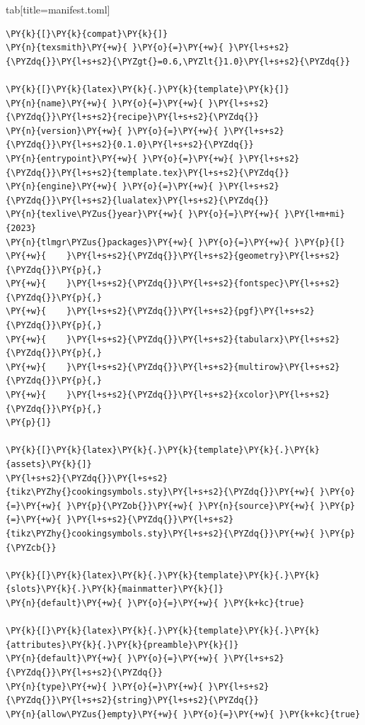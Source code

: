 \documentclass[a4paper,twoside]{article}
\begin{document}
\begin{tsdiv}{tab}[title=manifest.toml]
\begin{tscode}[lang=toml, engine=pygments]
\begin{Verbatim}[commandchars=\\\{\},breaklines, breakanywhere, commandchars=\\\{\}]
\PY{k}{[}\PY{k}{compat}\PY{k}{]}
\PY{n}{texsmith}\PY{+w}{ }\PY{o}{=}\PY{+w}{ }\PY{l+s+s2}{\PYZdq{}}\PY{l+s+s2}{\PYZgt{}=0.6,\PYZlt{}1.0}\PY{l+s+s2}{\PYZdq{}}

\PY{k}{[}\PY{k}{latex}\PY{k}{.}\PY{k}{template}\PY{k}{]}
\PY{n}{name}\PY{+w}{ }\PY{o}{=}\PY{+w}{ }\PY{l+s+s2}{\PYZdq{}}\PY{l+s+s2}{recipe}\PY{l+s+s2}{\PYZdq{}}
\PY{n}{version}\PY{+w}{ }\PY{o}{=}\PY{+w}{ }\PY{l+s+s2}{\PYZdq{}}\PY{l+s+s2}{0.1.0}\PY{l+s+s2}{\PYZdq{}}
\PY{n}{entrypoint}\PY{+w}{ }\PY{o}{=}\PY{+w}{ }\PY{l+s+s2}{\PYZdq{}}\PY{l+s+s2}{template.tex}\PY{l+s+s2}{\PYZdq{}}
\PY{n}{engine}\PY{+w}{ }\PY{o}{=}\PY{+w}{ }\PY{l+s+s2}{\PYZdq{}}\PY{l+s+s2}{lualatex}\PY{l+s+s2}{\PYZdq{}}
\PY{n}{texlive\PYZus{}year}\PY{+w}{ }\PY{o}{=}\PY{+w}{ }\PY{l+m+mi}{2023}
\PY{n}{tlmgr\PYZus{}packages}\PY{+w}{ }\PY{o}{=}\PY{+w}{ }\PY{p}{[}
\PY{+w}{    }\PY{l+s+s2}{\PYZdq{}}\PY{l+s+s2}{geometry}\PY{l+s+s2}{\PYZdq{}}\PY{p}{,}
\PY{+w}{    }\PY{l+s+s2}{\PYZdq{}}\PY{l+s+s2}{fontspec}\PY{l+s+s2}{\PYZdq{}}\PY{p}{,}
\PY{+w}{    }\PY{l+s+s2}{\PYZdq{}}\PY{l+s+s2}{pgf}\PY{l+s+s2}{\PYZdq{}}\PY{p}{,}
\PY{+w}{    }\PY{l+s+s2}{\PYZdq{}}\PY{l+s+s2}{tabularx}\PY{l+s+s2}{\PYZdq{}}\PY{p}{,}
\PY{+w}{    }\PY{l+s+s2}{\PYZdq{}}\PY{l+s+s2}{multirow}\PY{l+s+s2}{\PYZdq{}}\PY{p}{,}
\PY{+w}{    }\PY{l+s+s2}{\PYZdq{}}\PY{l+s+s2}{xcolor}\PY{l+s+s2}{\PYZdq{}}\PY{p}{,}
\PY{p}{]}

\PY{k}{[}\PY{k}{latex}\PY{k}{.}\PY{k}{template}\PY{k}{.}\PY{k}{assets}\PY{k}{]}
\PY{l+s+s2}{\PYZdq{}}\PY{l+s+s2}{tikz\PYZhy{}cookingsymbols.sty}\PY{l+s+s2}{\PYZdq{}}\PY{+w}{ }\PY{o}{=}\PY{+w}{ }\PY{p}{\PYZob{}}\PY{+w}{ }\PY{n}{source}\PY{+w}{ }\PY{p}{=}\PY{+w}{ }\PY{l+s+s2}{\PYZdq{}}\PY{l+s+s2}{tikz\PYZhy{}cookingsymbols.sty}\PY{l+s+s2}{\PYZdq{}}\PY{+w}{ }\PY{p}{\PYZcb{}}

\PY{k}{[}\PY{k}{latex}\PY{k}{.}\PY{k}{template}\PY{k}{.}\PY{k}{slots}\PY{k}{.}\PY{k}{mainmatter}\PY{k}{]}
\PY{n}{default}\PY{+w}{ }\PY{o}{=}\PY{+w}{ }\PY{k+kc}{true}

\PY{k}{[}\PY{k}{latex}\PY{k}{.}\PY{k}{template}\PY{k}{.}\PY{k}{attributes}\PY{k}{.}\PY{k}{preamble}\PY{k}{]}
\PY{n}{default}\PY{+w}{ }\PY{o}{=}\PY{+w}{ }\PY{l+s+s2}{\PYZdq{}}\PY{l+s+s2}{\PYZdq{}}
\PY{n}{type}\PY{+w}{ }\PY{o}{=}\PY{+w}{ }\PY{l+s+s2}{\PYZdq{}}\PY{l+s+s2}{string}\PY{l+s+s2}{\PYZdq{}}
\PY{n}{allow\PYZus{}empty}\PY{+w}{ }\PY{o}{=}\PY{+w}{ }\PY{k+kc}{true}


\end{Verbatim}
\end{tscode}
\end{tsdiv}
\end{document}
